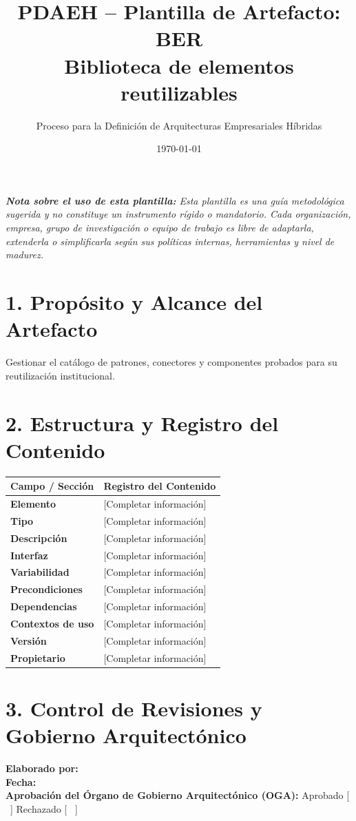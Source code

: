 \documentclass[11pt,a4paper]{article}
\title{\textbf{\color{brandgreen} PDAEH -- Plantilla de Artefacto: BER} \\[0.3em] \large Biblioteca de elementos reutilizables}
\author{Proceso para la Definición de Arquitecturas Empresariales Híbridas}
\date{\today}
\begin{document}
\maketitle

\noindent \textit{\textbf{Nota sobre el uso de esta plantilla:} Esta plantilla es una guía metodológica sugerida y no constituye un instrumento rígido o mandatorio. Cada organización, empresa, grupo de investigación o equipo de trabajo es libre de adaptarla, extenderla o simplificarla según sus políticas internas, herramientas y nivel de madurez.}

\section*{1. Propósito y Alcance del Artefacto}
Gestionar el catálogo de patrones, conectores y componentes probados para su reutilización institucional.

\section*{2. Estructura y Registro del Contenido}
\begin{tabularx}{\textwidth}{|>{\bfseries}p{4.5cm}|X|}
    \hline
    \rowcolor[gray]{0.92} Campo / Sección & Registro del Contenido \\ \hline
    \textbf{Elemento} & [Completar información] \\ \hline
    \textbf{Tipo} & [Completar información] \\ \hline
    \textbf{Descripción} & [Completar información] \\ \hline
    \textbf{Interfaz} & [Completar información] \\ \hline
    \textbf{Variabilidad} & [Completar información] \\ \hline
    \textbf{Precondiciones} & [Completar información] \\ \hline
    \textbf{Dependencias} & [Completar información] \\ \hline
    \textbf{Contextos de uso} & [Completar información] \\ \hline
    \textbf{Versión} & [Completar información] \\ \hline
    \textbf{Propietario} & [Completar información] \\ \hline
\end{tabularx}

\vspace{1.2cm}
\section*{3. Control de Revisiones y Gobierno Arquitectónico}
\noindent \textbf{Elaborado por:} \hrulefill \\[0.5em]
\textbf{Fecha:} \hrulefill \\[0.5em]
\textbf{Aprobación del Órgano de Gobierno Arquitectónico (OGA):} Aprobado [ \, ] \quad Rechazado [ \, ]
\end{document}

